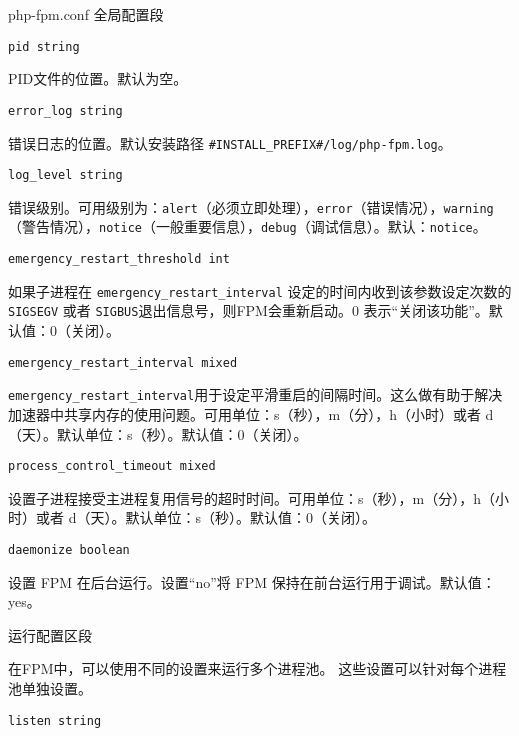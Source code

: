 \begin{compactenum}
\item php-fpm.conf 全局配置段

\begin{compactitem}
\item \texttt{pid string}

PID文件的位置。默认为空。

\item \texttt{error\_log string}

错误日志的位置。默认安装路径 \texttt{\#INSTALL\_PREFIX\#/log/php-fpm.log}。

\item \texttt{log\_level string}

错误级别。可用级别为：\texttt{alert}（必须立即处理），\texttt{error}（错误情况），\texttt{warning}（警告情况），\texttt{notice}（一般重要信息），\texttt{debug}（调试信息）。默认：\texttt{notice}。

\item \texttt{emergency\_restart\_threshold int}

如果子进程在 \texttt{emergency\_restart\_interval} 设定的时间内收到该参数设定次数的 \texttt{SIGSEGV} 或者 \texttt{SIGBUS}退出信息号，则FPM会重新启动。0 表示“关闭该功能”。默认值：0（关闭）。

\item \texttt{emergency\_restart\_interval mixed}

\texttt{emergency\_restart\_interval}用于设定平滑重启的间隔时间。这么做有助于解决加速器中共享内存的使用问题。可用单位：s（秒），m（分），h（小时）或者 d（天）。默认单位：s（秒）。默认值：0（关闭）。

\item \texttt{process\_control\_timeout mixed}

设置子进程接受主进程复用信号的超时时间。可用单位：s（秒），m（分），h（小时）或者 d（天）。默认单位：s（秒）。默认值：0（关闭）。

\item \texttt{daemonize boolean}

设置 FPM 在后台运行。设置“no”将 FPM 保持在前台运行用于调试。默认值：yes。

\end{compactitem}

\item 运行配置区段

在FPM中，可以使用不同的设置来运行多个进程池。 这些设置可以针对每个进程池单独设置。

\begin{compactitem}
\item \texttt{listen string}


\end{compactitem}
\end{compactenum}
